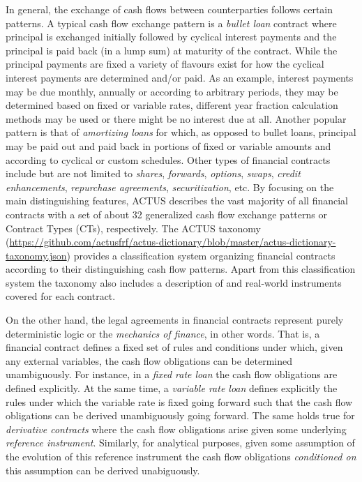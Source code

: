 \documentclass[9pt,oneside]{amsart}
\begin{document}
\begin{multicols}{2}
In general, the exchange of cash flows between counterparties follows certain patterns. A typical cash flow exchange pattern is a \textit{bullet loan} contract where principal is exchanged initially followed by cyclical interest payments and the principal is paid back (in a lump sum) at maturity of the contract. While the principal payments are fixed a variety of flavours exist for how the cyclical interest payments are determined and/or paid. As an example, interest payments may be due monthly, annually or according to arbitrary periods, they may be determined based on fixed or variable rates, different year fraction calculation methods may be used or there might be no interest due at all. Another popular pattern is that of \textit{amortizing loans} for which, as opposed to bullet loans, principal may be paid out and paid back in portions of fixed or variable amounts and according to cyclical or custom schedules. Other types of financial contracts include but are not limited to \textit{shares}, \textit{forwards}, \textit{options}, \textit{swaps}, \textit{credit enhancements}, \textit{repurchase agreements}, \textit{securitization}, etc. By focusing on the main distinguishing features, ACTUS describes the vast majority of all financial contracts with a set of about 32 generalized cash flow exchange patterns or Contract Types (CTs), respectively. 
The ACTUS taxonomy (\url{https://github.com/actusfrf/actus-dictionary/blob/master/actus-dictionary-taxonomy.json}) provides a classification system organizing financial contracts according to their distinguishing cash flow patterns. Apart from this classification system the taxonomy also includes a description of and real-world instruments covered for each contract.

On the other hand, the legal agreements in financial contracts represent purely deterministic logic or the \textit{mechanics of finance}, in other words. That is, a financial contract defines a fixed set of rules and conditions under which, given any external variables, the cash flow obligations can be determined unambiguously. For instance, in a \textit{fixed rate loan} the cash flow obligations are defined explicitly. At the same time, a \textit{variable rate loan} defines explicitly the rules under which the variable rate is fixed going forward such that the cash flow obligations can be derived unambiguously going forward. The same holds true for \textit{derivative contracts} where the cash flow obligations arise given some underlying \textit{reference instrument}. Similarly, for analytical purposes, given some assumption of the evolution of this reference instrument the cash flow obligations \textit{conditioned on} this assumption can be derived unabiguously.


\end{multicols}
\end{document}
